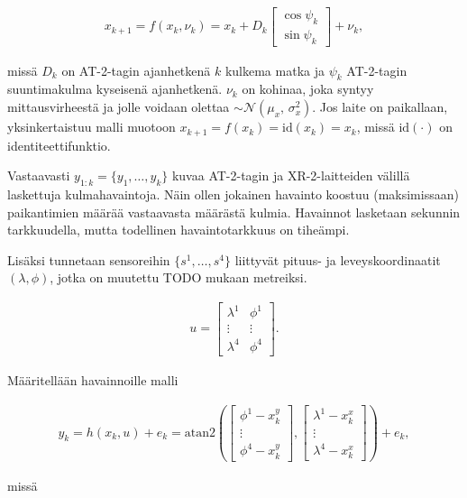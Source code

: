 \documentclass[
  12pt,
  a4paper, twoside]{book}
\begin{document}
\begin{align}\label{tilamalli-liikkuva}
x_{k+1}=f(x_k, \nu_k)=x_k+D_k \begin{bmatrix} \cos\psi_k \\ \sin\psi_k \end{bmatrix}+\nu_k,
\end{align}

\noindent missä \(D_k\) on AT-2-tagin ajanhetkenä \(k\) kulkema matka ja \(\psi_k\) AT-2-tagin suuntimakulma kyseisenä ajanhetkenä. \(\nu_k\) on kohinaa, joka syntyy mittausvirheestä ja jolle voidaan olettaa \(\sim \mathcal{N}(\mu_x,\,\sigma_x^{2})\). Jos laite on paikallaan, yksinkertaistuu malli muotoon \(x_{k+1}=f(x_k)=\text{id}(x_k)=x_k\), missä \(\text{id}(\cdot)\) on identiteettifunktio.

Vastaavasti \(y_{1:k}=\{y_1,\ldots,y_k\}\) kuvaa AT-2-tagin ja XR-2-laitteiden välillä laskettuja kulmahavaintoja. Näin ollen jokainen havainto koostuu (maksimissaan) paikantimien määrää vastaavasta määrästä kulmia. Havainnot lasketaan sekunnin tarkkuudella, mutta todellinen havaintotarkkuus on tiheämpi.

\noindent Lisäksi tunnetaan sensoreihin \(\{s^1,\ldots,s^4\}\) liittyvät pituus- ja leveyskoordinaatit \((\lambda, \phi)\), jotka on muutettu TODO mukaan metreiksi.

\begin{align}
u=\begin{bmatrix} \lambda^1 & \phi^1 \\   \vdots & \vdots \\ \lambda^4 & \phi^4 \end{bmatrix}.
\end{align}

Määritellään havainnoille malli

\begin{align}\label{havaintomalli}
y_k=h(x_k, u)+e_k=\text{atan2}(\begin{bmatrix}\phi^1-x_k^y\\ \vdots \\ \phi^4-x_k^y\end{bmatrix}, \begin{bmatrix}\lambda^1-x_k^x\\ \vdots \\ \lambda^4-x_k^x\end{bmatrix})+e_k,
\end{align}

\noindent missä
\end{document}
